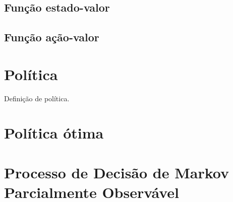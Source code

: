 \documentclass{article}
\begin{document}
    \subsection{Função estado-valor}
    
    \subsection{Função ação-valor}

\section{Política}

    Definição de política.

    \section{Política ótima}
    
\section{Processo de Decisão de Markov Parcialmente Observável}
\end{document}
